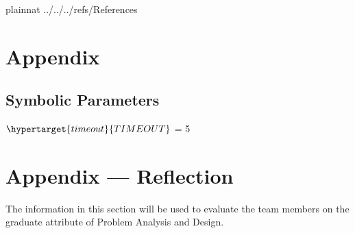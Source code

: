 \documentclass[12pt, titlepage]{article}
\begin{document}
  \newpage

   {plainnat}
   {../../../refs/References}

  \newpage

  \section{Appendix} \label{Appendix}

  \subsection{Symbolic Parameters}
  $\hypertarget{timeout}{TIMEOUT}$ = 5\\

  \newpage{}

  \section*{Appendix --- Reflection}


  The information in this section will be used to evaluate the team
  members on the
  graduate attribute of Problem Analysis and Design.

  
\end{document}
